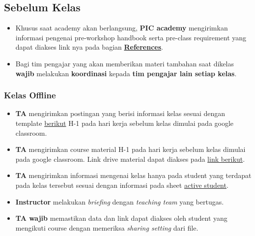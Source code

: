 \documentclass[
]{book}
\providecommand{\tightlist}{%
  \setlength{\itemsep}{0pt}\setlength{\parskip}{0pt}}
\begin{document}
\hypertarget{sebelum-kelas}{%
\subsection{Sebelum Kelas}\label{sebelum-kelas}}

\begin{itemize}
\tightlist
\item
  Khusus saat academy akan berlangsung, \textbf{PIC academy} mengirimkan informasi pengenai pre-workshop handbook serta pre-class requirement yang dapat diakses link nya pada bagian \href{https://algoritma4dummies.netlify.app/references.html}{\textbf{References}}.
\item
  Bagi tim pengajar yang akan memberikan materi tambahan saat dikelas \textbf{wajib} melakukan \textbf{koordinasi} kepada \textbf{tim pengajar lain setiap kelas}.
\end{itemize}

\hypertarget{kelas-offline}{%
\subsubsection{Kelas Offline}\label{kelas-offline}}

\begin{itemize}
\tightlist
\item
  \textbf{TA} mengirimkan postingan yang berisi informasi kelas sesuai dengan template \href{https://docs.google.com/document/d/1leWbp3Eb2AwumFieuHiWStSNOXsKJQJD_h0tAhA2fLs/edit?usp=sharing}{berikut} H-1 pada hari kerja sebelum kelas dimulai pada google classroom.
\item
  \textbf{TA} mengirimkan course material H-1 pada hari kerja sebelum kelas dimulai pada google classroom. Link drive material dapat diakses pada \href{https://drive.google.com/drive/folders/1I1h0p4BkvkUYV8mtDU7bgswE_awOIxWY?usp=sharing}{link berikut}.
\item
  \textbf{TA} mengirimkan informasi mengenai kelas hanya pada student yang terdapat pada kelas tersebut sesuai dengan informasi pada sheet \href{https://docs.google.com/spreadsheets/d/12FB9410fhRhZp9jl5qLe7x-LGw0QTSfLujA-dE867JE/edit?usp=sharing}{active student}.
\item
  \textbf{Instructor} melakukan \emph{briefing} dengan \emph{teaching team} yang bertugas.
\item
  \textbf{TA wajib} memastikan data dan link dapat diakses oleh student yang mengikuti course dengan memeriksa \emph{sharing setting} dari file.
\end{itemize}
\end{document}
